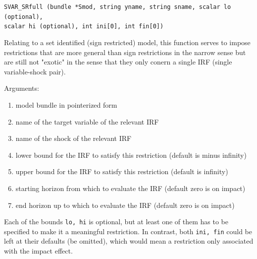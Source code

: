 \documentclass[a4paper,10pt]{article}
\newenvironment{funcdoc}[1]
{\noindent\hrulefill\newline\nopagebreak\texttt{#1}%
\nopagebreak\par\noindent\hrulefill%
\nopagebreak\par\nopagebreak\smallskip\nopagebreak\par}
{\bigskip}
\begin{document}
\begin{funcdoc}{SVAR\_SRfull (bundle *Smod, string yname, string sname, scalar lo (optional),\\
  scalar hi (optional), int ini[0], int fin[0])}
  
  \noindent Relating to a set identified (sign restricted) model, this function serves to impose restrictions that
  are more general than sign restrictions in the narrow sense but are still not "exotic" in the 
  sense that they only conern a single IRF (single variable-shock pair).
  
  \noindent Arguments:
 \begin{enumerate}
 \item model bundle in pointerized form
 \item name of the target variable of the relevant IRF
 \item name of the shock of the relevant IRF
 \item lower bound for the IRF to satisfy this restriction (default is minus infinity)
 \item upper bound for the IRF to satisfy this restriction (default is infinity)
 \item starting horizon from which to evaluate the IRF (default zero is on impact)
 \item end horizon up to which to evaluate the IRF (default zero is on impact)
  \end{enumerate}
  Each of the bounds \texttt{lo, hi} is optional, but at least one of them has to be specified
  to make it a meaningful restriction. In contrast, both \texttt{ini, fin} could be left at their defaults 
  (be omitted), which would mean a restriction only associated with the impact effect.
  \end{funcdoc}
\end{document}
